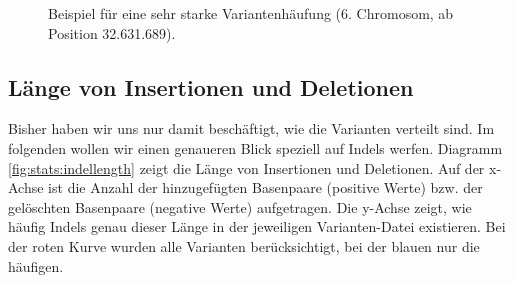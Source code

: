 \begin{figure}[hp]
\pgfplotsset{footnotesize,width=14cm,height=8cm,compat=1.8}
\begin{center}
\end{center}
\caption{Beispiel für eine sehr starke Variantenhäufung (6. Chromosom, ab Position 32.631.689).}
\label{fig:stats:examplewindow}
\end{figure}


\subsection{Länge von Insertionen und Deletionen}
\label{sec:stats:res:indellength}

Bisher haben wir uns nur damit beschäftigt, wie die Varianten verteilt sind. Im folgenden wollen wir einen genaueren Blick speziell auf Indels werfen. Diagramm \ref{fig:stats:indellength} zeigt die Länge von Insertionen und Deletionen. Auf der x-Achse ist die Anzahl der hinzugefügten Basenpaare (positive Werte) bzw. der gelöschten Basenpaare (negative Werte) aufgetragen. Die y-Achse zeigt, wie häufig Indels genau dieser Länge in der jeweiligen Varianten-Datei existieren. Bei der roten Kurve wurden alle Varianten berücksichtigt, bei der blauen nur die häufigen.

